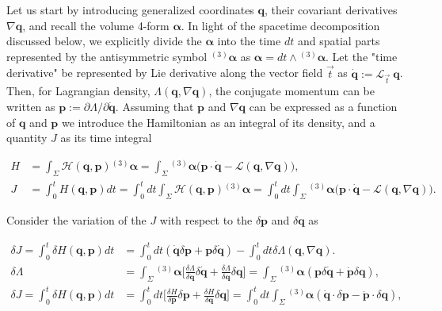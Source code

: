 \documentclass[11pt,a4paper,headinclude=true,DIV=14,BCOR=8mm,chapterprefix,listof=totoc,twoside,openright,abstracton]{scrbook}
\begin{document}
Let us start by introducing generalized coordinates $\boldsymbol{q}$, their covariant derivatives $\nabla\boldsymbol{q}$, and recall the volume 4-form $\boldsymbol{\alpha}$. In light of the spacetime decomposition discussed below, we explicitly divide the $\boldsymbol{\alpha}$ into the time $dt$ and spatial parts represented by the antisymmetric symbol ${^{(3)}\boldsymbol{\alpha}}$ as $\boldsymbol{\alpha} = dt \wedge {^{(3)}\boldsymbol{\alpha}}$. Let the "time derivative" be represented by Lie derivative along the vector field $\vec{t}$ as $\dot{\boldsymbol{q}} := \mathcal{L}_{\vec{t}}\:\boldsymbol{q}$. Then, for Lagrangian density, $\Lambda(\boldsymbol{q}, \nabla\boldsymbol{q})$, the conjugate momentum can be written as $\boldsymbol{p} := \partial\Lambda / \partial\dot{\boldsymbol{q}}$. Assuming that $\boldsymbol{p}$ and $\nabla\boldsymbol{q}$ can be expressed as a function of $\boldsymbol{q}$ and $\boldsymbol{p}$ we introduce the Hamiltonian as an integral of its density, and a quantity $J$ as its time integral

\begin{align}
H &= \int_{\Sigma}\mathcal{H}(\boldsymbol{q},\boldsymbol{p}){^{(3)}\boldsymbol{\alpha}} = \int_{\Sigma}{^{(3)}\boldsymbol{\alpha}}\big(\boldsymbol{p}\cdot\dot{\boldsymbol{q}} - \mathcal{L}(\boldsymbol{q}, \nabla\boldsymbol{q})\big), \\
J &= \int_{0}^{t}H(\boldsymbol{q},\boldsymbol{p})dt = \int_{0}^{t}dt\int_{\Sigma}\mathcal{H}(\boldsymbol{q},\boldsymbol{p}){^{(3)}\boldsymbol{\alpha}} = \int_{0}^{t}dt\int_{\Sigma}{^{(3)}\boldsymbol{\alpha}}\Big(\boldsymbol{p}\cdot\dot{\boldsymbol{q}} - \mathcal{L}(\boldsymbol{q},\nabla\boldsymbol{q})\Big).
\end{align}

Consider the variation of the $J$ with respect to the $\delta\boldsymbol{p}$ and $\delta\boldsymbol{q}$ as

\begin{align}
\delta J = \int_{0}^{t}\delta H(\boldsymbol{q},\boldsymbol{p})dt &= \int_{0}^{t}dt (\dot{\boldsymbol{q}}\delta\boldsymbol{p}+\boldsymbol{p}\delta\dot{\boldsymbol{q}}) - \int_{0}^{t}dt\delta\Lambda(\boldsymbol{q}, \nabla\boldsymbol{q}).\\
\delta\Lambda &= \int_{\Sigma}{^{(3)}\boldsymbol{\alpha}}\Bigg[\frac{\delta\Lambda}{\delta\dot{\boldsymbol{q}}}\delta\dot{\boldsymbol{q}}+\frac{\delta\Lambda}{\delta\boldsymbol{q}}\delta\boldsymbol{q}\Bigg] = 
\int_{\Sigma}{^{(3)}\boldsymbol{\alpha}}(\boldsymbol{p}\delta\dot{\boldsymbol{q}} + \dot{\boldsymbol{p}}\delta\boldsymbol{q}),\\
\delta J = \int_{0}^{t} \delta H(\boldsymbol{q},\boldsymbol{p})dt &=  
\int_{0}^{t}dt\Bigg[ \frac{\delta H}{\delta \boldsymbol{p}}\delta \boldsymbol{p} + \frac{\delta H}{\delta \boldsymbol{q}}\delta \boldsymbol{q} \Bigg] =
\int_{0}^{t}dt\int_{\Sigma}{^{(3)}\boldsymbol{\alpha}}(\dot{\boldsymbol{q}}\cdot\delta\boldsymbol{p}-\dot{\boldsymbol{p}}\cdot\delta\boldsymbol{q}),
\end{align}
\end{document}
